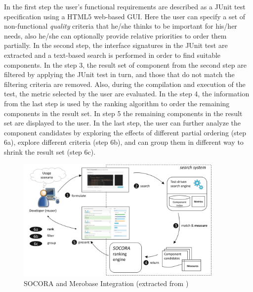 In the first step the user's functional requirements are described as a JUnit test specification using a HTML5 web-based GUI. Here the user can specify a set of non-functional \textit{quality} criteria that he/she thinks to be important for his/her needs, also he/she can optionally provide relative priorities to order them partially. In the second step, the interface signatures in the JUnit test are extracted and a text-based search is performed in order to find suitable components. In the step 3, the result set of component from the second step are filtered by applying the JUnit test in turn, and those that do not match the filtering criteria are removed. Also, during the compilation and execution of the test, the metric selected by the user are evaluated. In the step 4, the information from the last step is used by the ranking algorithm to order the remaining components in the result set. In step 5 the remaining components in the result set are displayed to the user. In the last step, the user can further analyze the component candidates by exploring the effects of different partial ordering (step 6a), explore different criteria (step 6b), and can group them in different way to shrink the result set (step 6c).

\begin{figure}[hb]
	\centering
    \includegraphics[width=0.9\textwidth]{grafiken/socora-merobase}
    \caption{SOCORA and Merobase Integration (extracted from \cite{Kessel2016})}
    \label{fig:socora-merobase}
\end{figure}